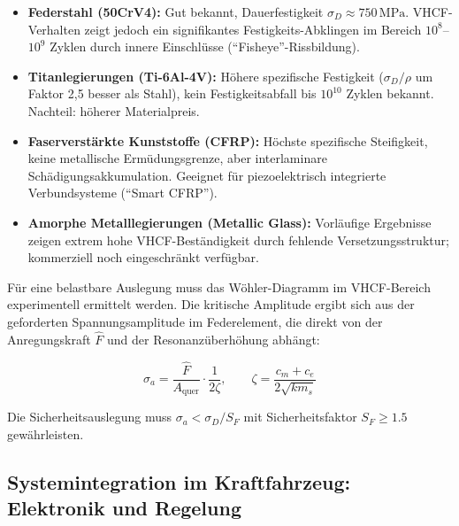 ﻿\documentclass[12pt, a4paper]{report}
\theoremstyle{definition}
\theoremstyle{remark}
\begin{document}
\begin{itemize}
  \item \textbf{Federstahl (50CrV4):} Gut bekannt, Dauerfestigkeit
        $\sigma_D \approx 750\,\text{MPa}$. VHCF-Verhalten zeigt jedoch
        ein signifikantes Festigkeits-Abklingen im Bereich $10^8$--$10^9$ Zyklen
        durch innere Einschlüsse (``Fisheye''-Rissbildung).

  \item \textbf{Titanlegierungen (Ti-6Al-4V):} Höhere spezifische Festigkeit
        ($\sigma_D/\rho$ um Faktor 2,5 besser als Stahl), kein Festigkeitsabfall
        bis $10^{10}$ Zyklen bekannt. Nachteil: höherer Materialpreis.

  \item \textbf{Faserverstärkte Kunststoffe (CFRP):} Höchste spezifische
        Steifigkeit, keine metallische Ermüdungsgrenze, aber interlaminare
        Schädigungsakkumulation. Geeignet für piezoelektrisch integrierte
        Verbundsysteme (``Smart CFRP'').

  \item \textbf{Amorphe Metalllegierungen (Metallic Glass):} Vorläufige
        Ergebnisse zeigen extrem hohe VHCF-Beständigkeit durch fehlende
        Versetzungsstruktur; kommerziell noch eingeschränkt verfügbar.
\end{itemize}

Für eine belastbare Auslegung muss das Wöhler-Diagramm im VHCF-Bereich
experimentell ermittelt werden. Die kritische Amplitude ergibt sich aus
der geforderten Spannungsamplitude im Federelement, die direkt von der
Anregungskraft $\hat{F}$ und der Resonanzüberhöhung abhängt:

\begin{equation}
  \sigma_a = \frac{\hat{F}}{A_{\text{quer}}} \cdot \frac{1}{2\zeta},
  \qquad \zeta = \frac{c_m + c_e}{2\sqrt{km_s}}
  \label{eq:sigma_a}
\end{equation}

Die Sicherheitsauslegung muss $\sigma_a < \sigma_D / S_F$ mit
Sicherheitsfaktor $S_F \geq 1.5$ gewährleisten.

\subsection{Systemintegration im Kraftfahrzeug: Elektronik und Regelung}
\label{ssec:ausblick_elektronik}
\end{document}
